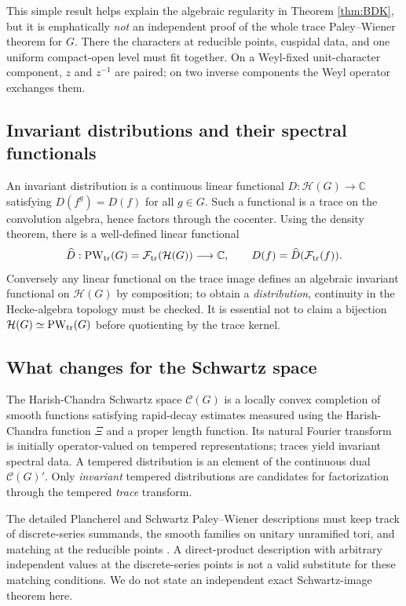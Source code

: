 \documentclass[12pt,letterpaper]{amsart}
\numberwithin{equation}{section}
\theoremstyle{definition}
\theoremstyle{remark}
\newcommand{\calH}{\mathcal H}
\newcommand{\calC}{\mathcal C}
\newcommand{\PW}{\operatorname{PW}}
\begin{document}
This simple result helps explain the algebraic regularity in Theorem \ref{thm:BDK}, but it is emphatically \emph{not} an independent proof of the whole trace Paley--Wiener theorem for $G$. There the characters at reducible points, cuspidal data, and one uniform compact-open level must fit together. On a Weyl-fixed unit-character component, $z$ and $z^{-1}$ are paired; on two inverse components the Weyl operator exchanges them.

\subsection{Invariant distributions and their spectral functionals}
An invariant distribution is a continuous linear functional $D:\calH(G)\to\mathbb C$ satisfying $D(f^g)=D(f)$ for all $g\in G$. Such a functional is a trace on the convolution algebra, hence factors through the cocenter.  Using the density theorem, there is a well-defined linear functional
\begin{equation}\label{eq:distribution-factor}
\widehat D:\PW_{\rm tr}(G)=\mathcal F_{\rm tr}(\calH(G))\longrightarrow\mathbb C,
\qquad D(f)=\widehat D(\mathcal F_{\rm tr}(f)).
\end{equation}
Conversely any linear functional on the trace image defines an algebraic invariant functional on $\calH(G)$ by composition; to obtain a \emph{distribution}, continuity in the Hecke-algebra topology must be checked. It is essential not to claim a bijection $\calH(G)\simeq\PW_{\rm tr}(G)$ before quotienting by the trace kernel.

\subsection{What changes for the Schwartz space}\label{sec:schwartz}
The Harish-Chandra Schwartz space $\calC(G)$ is a locally convex completion of smooth functions satisfying rapid-decay estimates measured using the Harish-Chandra function $\Xi$ and a proper length function. Its natural Fourier transform is initially operator-valued on tempered representations; traces yield invariant spectral data. A tempered distribution is an element of the continuous dual $\calC(G)'$. Only \emph{invariant} tempered distributions are candidates for factorization through the tempered \emph{trace} transform.

The detailed Plancherel and Schwartz Paley--Wiener descriptions must keep track of discrete-series summands, the smooth families on unitary unramified tori, and matching at the reducible points \cite{Cl91,Si79}.  A direct-product description with arbitrary independent values at the discrete-series points is not a valid substitute for these matching conditions. We do not state an independent exact Schwartz-image theorem here.
\end{document}
